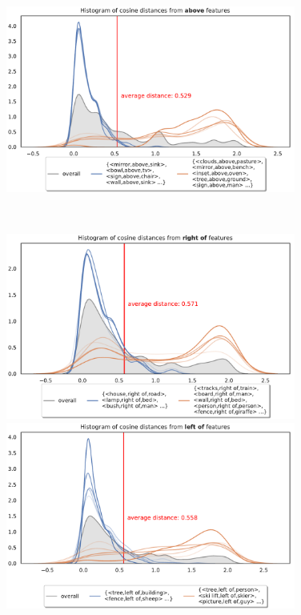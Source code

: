 \begin{figure}
\begin{minipage}{0.5\textwidth}
	\end{minipage}%
	\begin{minipage}{0.5\textwidth}
		\centering
		\includegraphics[width=0.85\textwidth]{studies/sc2020/figures/above_variations_what.pdf}
	\end{minipage}\\
	\begin{minipage}{0.5\textwidth}
		\centering
		\includegraphics[width=0.85\textwidth]{studies/sc2020/figures/right_of_variations_what.pdf}
	\end{minipage}%
	\begin{minipage}{0.5\textwidth}
		\centering
		\includegraphics[width=0.85\textwidth]{studies/sc2020/figures/left_of_variations_what.pdf}

\end{minipage}
\end{figure}
